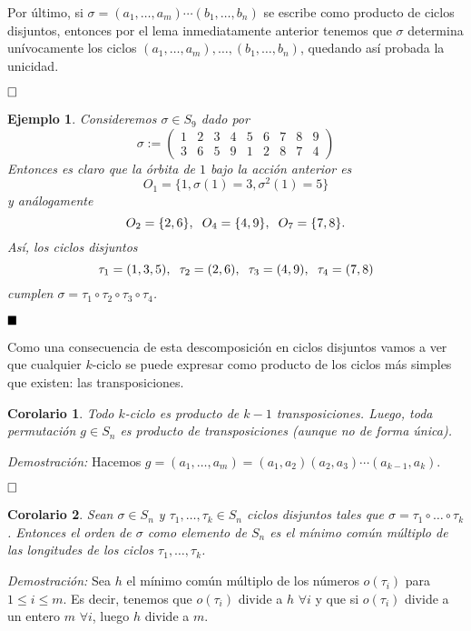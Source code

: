 \documentclass[12pt]{article}
\newtheorem{example}{Ejemplo}[theorem]
\newtheorem{corolario}{Corolario}[theorem]
\begin{document}
Por último, si $\sigma = (a_{1}, \ldots, a_{m}) \cdots(b_{1}, \ldots, b_{n})$ se escribe como producto de ciclos disjuntos, entonces por el lema inmediatamente anterior tenemos que $\sigma$ determina unívocamente los ciclos $(a_{1}, \ldots, a_{m}), \ldots, (b_{1}, \ldots, b_{n})$, quedando así probada la unicidad.

$\hfill \square$

\begin{example}\label{eq:excidis} Consideremos $\sigma \in S_{9}$ dado por $$\sigma:= \left(\begin{matrix}
1 &2 &3 &4 &5 &6 &7 &8 &9 \\
3 &6 &5 &9 &1 &2 &8 &7 &4
\end{matrix}
\right)$$ Entonces es claro que la órbita de $1$ bajo la acción anterior es $$O_{1} = \lbrace 1, \sigma(1)=3, \sigma^{2}(1) = 5 \rbrace$$ y análogamente $$O_{2} = \lbrace 2,6 \rbrace, \hspace{0.2cm} O_{4} = \lbrace 4,9 \rbrace, \hspace{0.2cm} O_{7} = \lbrace 7,8 \rbrace.$$ Así, los ciclos disjuntos $$\tau_{1} = (1,3,5), \hspace{0.2cm} \tau_{2} = (2,6), \hspace{0.2cm} \tau_{3} = (4,9), \hspace{0.2cm} \tau_{4} = (7,8)$$ cumplen $\sigma = \tau_{1} \circ \tau_{2} \circ \tau_{3} \circ \tau_{4}$.

\end{example}

$\hfill \blacksquare$

Como una consecuencia de esta descomposición en ciclos disjuntos vamos a ver que cualquier $k$-ciclo se puede expresar como producto de los ciclos más simples que existen: las transposiciones.

\begin{corolario} Todo $k$-ciclo es producto de $k-1$ transposiciones. Luego, toda permutación $g\in S_{n}$ es producto de transposiciones (aunque no de forma única).
\end{corolario}
\emph{Demostración: }
Hacemos $g = (a_{1}, \ldots, a_{m})=(a_{1},a_{2}) (a_{2},a_{3}) \cdots (a_{k-1},a_{k}).$

$\hfill \square$

\begin{corolario} 
Sean $\sigma \in S_{n}$ y $\tau_{1}, \ldots, \tau_{k} \in S_{n}$ ciclos disjuntos tales que $\sigma = \tau_{1} \circ \ldots \circ \tau_{k}$. Entonces el orden de $\sigma$ como elemento de $S_{n}$ es el mínimo común múltiplo de las longitudes de los ciclos $\tau_{1}, \ldots, \tau_{k}$.
\end{corolario} 
\emph{Demostración: }Sea $h$ el mínimo común múltiplo de los números $o(\tau_i)$ para $1 \leq i \leq m$. Es decir, tenemos que $o(\tau_i)$ divide a $h$ $\forall i$ y que si $o(\tau_i)$ divide a un entero $m$ $\forall i$, luego $h$ divide a $m$.
\end{document}
